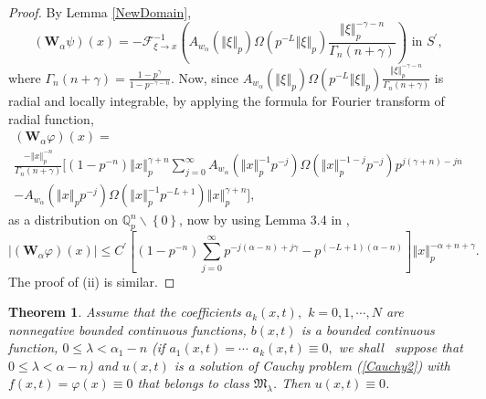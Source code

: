 \documentclass{amsart}\usepackage{amsfonts}
\newtheorem{theorem}{Theorem}[section]
\theoremstyle{plain}
\numberwithin{equation}{section}
\begin{document}
\begin{proof}
By Lemma \ref{NewDomain},\[
(\mathbf{W}_{\alpha}\psi)(x)=-\mathcal{F}_{\xi\rightarrow x}^{-1}\left(
A_{w_{\alpha}}(\left\Vert \xi\right\Vert _{p})\Omega(p^{-L}\left\Vert
\xi\right\Vert _{p})\frac{\left\Vert \xi\right\Vert _{p}^{-\gamma-n}}{\Gamma_{n}(n+\gamma)}\right)  \text{\ in }S^{\prime},
\]
where $\Gamma_{n}(n+\gamma)=\frac{1-p^{\gamma}}{1-p^{-\gamma-n}}$. Now, since
$A_{w_{\alpha}}(\left\Vert \xi\right\Vert _{p})\Omega(p^{-L}\left\Vert
\xi\right\Vert _{p})\frac{\left\Vert \xi\right\Vert _{p}^{-\gamma-n}}{\Gamma_{n}(n+\gamma)}$ is radial and locally integrable, by applying the
formula for Fourier transform of radial function,\begin{multline*}
(\mathbf{W}_{\alpha}\varphi)(x)=\\
\frac{-\left\Vert x\right\Vert _{p}^{-n}}{\Gamma_{n}(n+\gamma)}[(1-p^{-n})\left\Vert x\right\Vert _{p}^{\gamma+n}{\displaystyle\sum\limits_{j=0}^{\infty}}
A_{w_{\alpha}}(\left\Vert x\right\Vert _{p}^{-1}p^{-j})\Omega(\left\Vert
x\right\Vert _{p}^{-1-j}p^{-j})p^{j(\gamma+n)-jn}\\
-A_{w_{\alpha}}(\left\Vert x\right\Vert _{p}p^{-j})\Omega(\left\Vert
x\right\Vert _{p}^{-1}p^{-L+1})\left\Vert x\right\Vert _{p}^{\gamma+n}],
\end{multline*}
as a distribution on $\mathbb{Q}_{p}^{n}\smallsetminus\left\{  0\right\}  $,
now by using Lemma 3.4 in \cite{Ch-Z},\[
\left\vert (\mathbf{W}_{\alpha}\varphi)(x)\right\vert \leq C^{\prime}\left[
(1-p^{-n}){\displaystyle\sum\limits_{j=0}^{\infty}}
p^{-j(\alpha-n)+j\gamma}-p^{(-L+1)(\alpha-n)}\right]  \left\Vert x\right\Vert
_{p}^{-\alpha+n+\gamma}.
\]
The proof of (ii) is similar.
\end{proof}

\begin{theorem}
\label{uniqueTheo}Assume that the coefficients $a_{k}(x,t),$ $k=0,1,\cdots,N$
are nonnegative bounded continuous functions, $b(x,t)$ is a bounded continuous
function, $0\leq\lambda<\alpha_{1}-n$ (if $a_{1}(x,t)=\cdots$ $a_{k}(x,t)\equiv0,$ we shall \ suppose that $0\leq\lambda<\alpha-n$) and $u(x,t)$
is a solution of Cauchy problem (\ref{Cauchy2}) with \ $f(x,t)=\varphi
(x)\equiv0$ that belongs to class $\mathcal{\mathfrak{M}}_{\lambda}$. Then
$u(x,t)\equiv0$.
\end{theorem}
\end{document}
